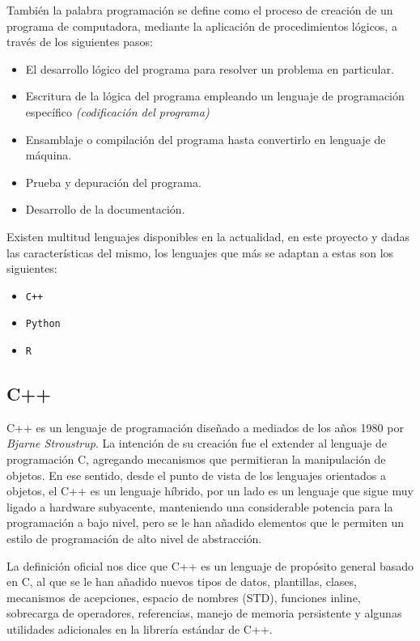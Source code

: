 \documentclass[12pt]{book} %
\begin{document}
	También la palabra programación se define como el proceso de creación de un programa de computadora, mediante la aplicación de procedimientos 
	lógicos, a través de los siguientes pasos:
	\begin{multicols}{2}	
		\begin{itemize}
			\item El desarrollo lógico del programa para resolver un problema en particular.
			\item Escritura de la lógica del programa empleando un lenguaje de programación específico \textit{(codificación del programa)}
			\item Ensamblaje o compilación del programa hasta convertirlo en lenguaje de máquina.
			\item Prueba y depuración del programa.
			\item Desarrollo de la documentación.
		\end{itemize}
	\end{multicols}
	
	Existen multitud lenguajes disponibles en la actualidad, en este proyecto y dadas las características del mismo, los lenguajes que más se 
	adaptan a estas son los siguientes:
	\begin{multicols}{3}	
		\begin{itemize}
			\item \texttt{C++}
			\item \texttt{Python}
			\item \texttt{R}		
		\end{itemize}
	\end{multicols}
	
	\subsection{C++}
		\textsc{C++} es un lenguaje de programación diseñado a mediados de los años 1980 por \textit{Bjarne Stroustrup}. La intención 
		de su creación fue el extender al lenguaje de programación \textsc{C}, agregando mecanismos que permitieran la manipulación de
		objetos. En ese sentido, desde el punto de vista de los lenguajes orientados a objetos, el C++ es un lenguaje híbrido, por un lado 
		es un lenguaje que sigue muy ligado a hardware subyacente, manteniendo una considerable potencia para la programación a bajo nivel, 
		pero se le han añadido elementos que le permiten un estilo de programación de alto nivel de abstracción.
		
		La definición oficial nos dice que C++ es un lenguaje de propósito general basado en C, al que se le han añadido nuevos tipos de 
		datos, plantillas, clases, mecanismos de acepciones, espacio de nombres (STD), funciones inline, sobrecarga de operadores, 
		referencias, manejo de memoria persistente y algunas utilidades adicionales en la librería estándar de C++.
		
\end{document}
